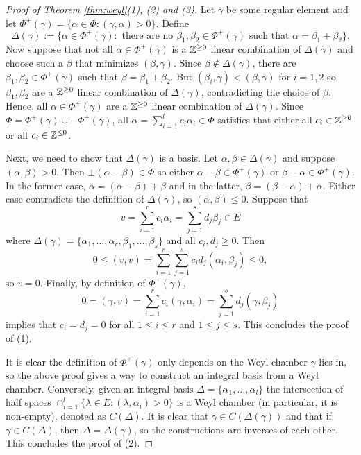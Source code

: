 \begin{proof}[Proof of Theorem \ref{thm:weyl}(1), (2) and (3)]
    Let $\gamma$ be some regular element and let $\Phi^+(\gamma)=\{\alpha\in\Phi:(\gamma,\alpha)>0\}$. Define $$\Delta(\gamma):=\{\alpha\in\Phi^+(\gamma):\text{ there are no }\beta_1,\beta_2\in\Phi^+(\gamma) \text{ such that }\alpha=\beta_1+\beta_2\}.$$ 
    Now suppose that not all $\alpha\in\Phi^+(\gamma)$ is a $\mathbb{Z}^{\geq0}$ linear combination of $\Delta(\gamma)$ and choose such a $\beta$ that minimizes $(\beta,\gamma)$. Since $\beta\not\in\Delta(\gamma)$, there are $\beta_1,\beta_2\in\Phi^+(\gamma)$ such that $\beta=\beta_1+\beta_2$. But $(\beta_i,\gamma)<(\beta,\gamma)$ for $i=1,2$ so $\beta_1,\beta_2$ are a $\mathbb{Z}^{\geq0}$ linear combination of $\Delta(\gamma)$, contradicting the choice of $\beta$. Hence, all $\alpha\in\Phi^+(\gamma)$ are a $\mathbb{Z}^{\geq0}$ linear combination of $\Delta(\gamma)$. Since $\Phi=\Phi^+(\gamma)\cup-\Phi^+(\gamma)$, all $\alpha=\sum_{i=1}^l c_i\alpha_i\in\Phi$ satisfies that either all $c_i\in\mathbb{Z}^{\geq 0}$ or all $c_i\in\mathbb{Z}^{\leq 0}$.

    Next, we need to show that $\Delta(\gamma)$ is a basis. Let $\alpha,\beta\in\Delta(\gamma)$ and suppose $(\alpha,\beta)>0$. Then $\pm(\alpha-\beta)\in\Phi$ so either $\alpha-\beta\in\Phi^+(\gamma)$ or $\beta-\alpha\in\Phi^+(\gamma)$. In the former case, $\alpha=(\alpha-\beta)+\beta$ and in the latter, $\beta=(\beta-\alpha)+\alpha$. Either case contradicts the definition of $\Delta(\gamma)$, so $(\alpha,\beta)\leq0$.
    Suppose that $$v=\sum_{i=1}^rc_i\alpha_i=\sum_{j=1}^sd_j\beta_j\in E$$ where $\Delta(\gamma)=\{\alpha_1,\ldots,\alpha_r,\beta_1,\ldots,\beta_s\}$ and all $c_i,d_j\geq0$. Then
    $$0\leq(v,v)=\sum_{i=1}^r\sum_{j=1}^sc_id_j(\alpha_i,\beta_j)\leq0,$$
    so $v=0$. Finally, by definition of $\Phi^+(\gamma)$,
    $$0=(\gamma,v)=\sum_{i=1}^{r}c_i(\gamma,\alpha_i)=\sum_{j=1}^{s}d_j(\gamma,\beta_j)$$
    implies that $c_i=d_j=0$ for all $1\leq i\leq r$ and $1\leq j\leq s$. This concludes the proof of (1).

    It is clear the definition of $\Phi^+(\gamma)$ only depends on the Weyl chamber $\gamma$ lies in, so the above proof gives a way to construct an integral basis from a Weyl chamber. Conversely, given an integral basis $\Delta=\{\alpha_1,\ldots,\alpha_l\}$ the intersection of half spaces $\cap_{i=1}^l\{\lambda\in E:(\lambda,\alpha_i)>0\}$ is a Weyl chamber (in particular, it is non-empty), denoted as $C(\Delta)$. It is clear that $\gamma\in C(\Delta(\gamma))$ and that if $\gamma\in C(\Delta)$, then $\Delta=\Delta(\gamma)$, so the constructions are inverses of each other. This concludes the proof of (2).


\end{proof}
